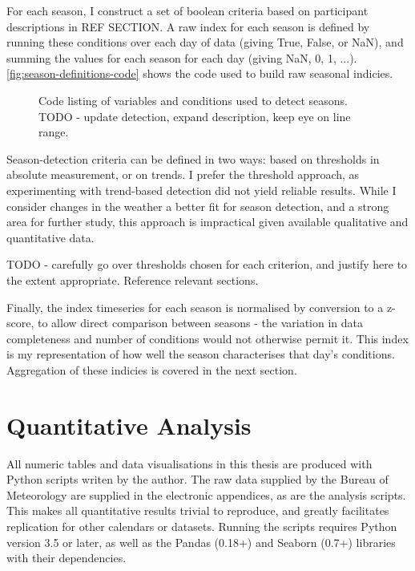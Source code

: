 For each season, I construct a set of boolean criteria based on participant
descriptions in REF SECTION.  A raw index for each season is defined by
running these conditions over each day of data (giving True, False, or NaN),
and summing the values for each season for each day (giving NaN, 0, 1, ...).
\autoref{fig:season-definitions-code} shows the code used to build raw
seasonal indicies.

\begin{figure}[h]
    
    \caption[Python code: definition of season indicies]{
        Code listing of variables and conditions used to detect seasons.
        TODO - update detection, expand description, keep eye on line range.
        }
    \label{fig:season-definitions-code}
\end{figure}

Season-detection criteria can be defined in two ways: based on thresholds
in absolute measurement, or on trends.  I prefer the threshold approach,
as experimenting with trend-based detection did not yield reliable results.
While I consider changes in the weather a better fit for season detection,
and a strong area for further study, this approach is impractical given available
qualitative and quantitative data.

TODO - carefully go over thresholds chosen for each criterion, and
justify here to the extent appropriate.  Reference relevant sections.

Finally, the index timeseries for each season is normalised by conversion to
a z-score, to allow direct comparison between seasons - the variation in data
completeness and number of conditions would not otherwise permit it.
This index is my representation of how well the season characterises that day's
conditions.  Aggregation of these indicies is covered in the next section.



\section{Quantitative Analysis}

All numeric tables and data visualisations in this thesis are produced
with Python scripts writen by the author.  The raw data supplied by the
Bureau of Meteorology are supplied in the electronic appendices, as
are the analysis scripts.  This makes all quantitative results trivial
to reproduce, and greatly facilitates replication for other calendars
or datasets.  Running the scripts requires Python version 3.5 or later,
as well as the Pandas (0.18+) and Seaborn (0.7+) libraries with their
dependencies.

